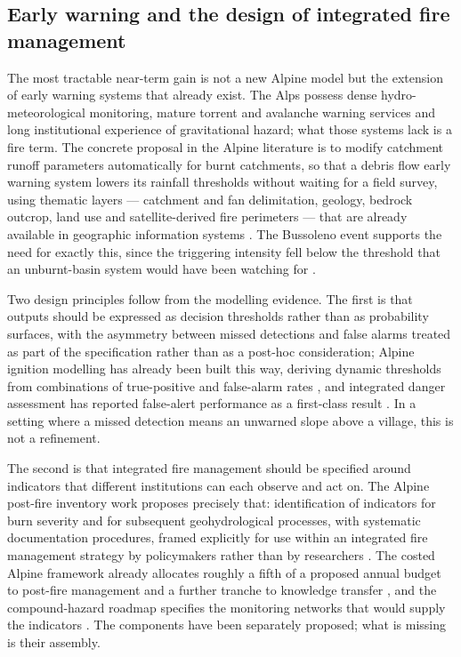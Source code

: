 \documentclass[11pt,a4paper]{article}
\begin{document}
\subsection{Early warning and the design of integrated fire management}

The most tractable near-term gain is not a new Alpine model but the extension of early warning systems that already exist. The Alps possess dense hydro-meteorological monitoring, mature torrent and avalanche warning services and long institutional experience of gravitational hazard; what those systems lack is a fire term. The concrete proposal in the Alpine literature is to modify catchment runoff parameters automatically for burnt catchments, so that a debris flow early warning system lowers its rainfall thresholds without waiting for a field survey, using thematic layers --- catchment and fan delimitation, geology, bedrock outcrop, land use and satellite-derived fire perimeters --- that are already available in geographic information systems \citep{tiranti_wildfires_2021}. The Bussoleno event supports the need for exactly this, since the triggering intensity fell below the threshold that an unburnt-basin system would have been watching for \citep{laporta_postwildfire_2025}.

Two design principles follow from the modelling evidence. The first is that outputs should be expressed as decision thresholds rather than as probability surfaces, with the asymmetry between missed detections and false alarms treated as part of the specification rather than as a post-hoc consideration; Alpine ignition modelling has already been built this way, deriving dynamic thresholds from combinations of true-positive and false-alarm rates \citep{moreno_1_nodate}, and integrated danger assessment has reported false-alert performance as a first-class result \citep{muller_towards_2020}. In a setting where a missed detection means an unwarned slope above a village, this is not a refinement.

The second is that integrated fire management should be specified around indicators that different institutions can each observe and act on. The Alpine post-fire inventory work proposes precisely that: identification of indicators for burn severity and for subsequent geohydrological processes, with systematic documentation procedures, framed explicitly for use within an integrated fire management strategy by policymakers rather than by researchers \citep{melzner_wildfire-induced_2025}. The costed Alpine framework already allocates roughly a fifth of a proposed annual budget to post-fire management and a further tranche to knowledge transfer \citep{muller_forest_2020}, and the compound-hazard roadmap specifies the monitoring networks that would supply the indicators \citep{baselt_compound_2026}. The components have been separately proposed; what is missing is their assembly.
\end{document}

